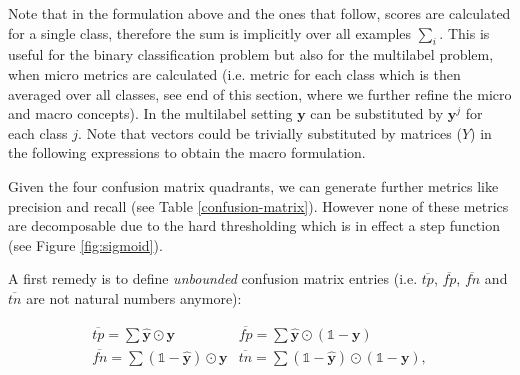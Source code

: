 Note that in the formulation above and the ones that follow, scores are calculated for a single class, therefore the sum is implicitly over all examples \(\sum_i\). This is useful for the binary classification problem but also for the multilabel problem, when micro metrics are calculated (i.e. metric for each class which is then averaged over all classes, see end of this section, where we further refine the micro and macro concepts). In the multilabel setting $\mathbf{y}$ can be substituted by $\mathbf{y}^j$ for each class $j$. Note that vectors could be trivially substituted by matrices ($Y$) in the following expressions to obtain the macro formulation.



Given the four confusion matrix quadrants, we can generate further metrics like precision and recall (see Table \ref{confusion-matrix}). However none of these metrics are decomposable due to the hard thresholding which is in effect a step function (see Figure \ref{fig:sigmoid}).

A first remedy is to define \emph{unbounded} confusion matrix entries (i.e. \(\overline{tp}\), \(\overline{fp}\), \(\overline{fn}\) and  \(\overline{tn}\) are not natural numbers anymore):

\begin{equation}
\label{eq:unbounded}
\begin{array}{ll} \overline{tp} = \sum \hat{\mathbf{y}} \odot \mathbf{y}  & \overline{fp} = \sum \hat{\mathbf{y}} \odot (\mathds{1} - \mathbf{y}) \\ \overline{fn} = \sum (\mathds{1} - \hat{\mathbf{y}}) \odot \mathbf{y} & \overline{tn} = \sum (\mathds{1} - \hat{\mathbf{y}}) \odot (\mathds{1} - \mathbf{y}),
\end{array}
\end{equation}


